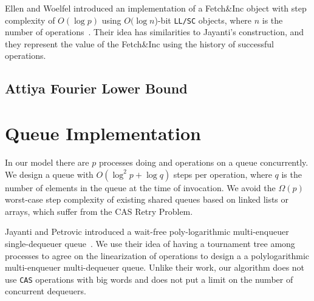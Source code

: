 \documentclass[10pt]{article}
\newcommand{\nf}[1]{{\normalfont{\texttt{#1}}}}
\theoremstyle{definition}
\begin{document}
Ellen and Woelfel introduced an implementation of a Fetch\&Inc object with step complexity of $O(\log p)$ using $O(\log n$)-bit \texttt{LL/SC} objects, where $n$ is the number of operations~\cite{10.1007/978-3-642-41527-2_20}. Their idea has similarities to Jayanti's construction, and they represent the value of the Fetch\&Inc using the history of successful operations. 




\subsection{Attiya Fourier Lower Bound}
\pagebreak

\pagebreak
\section{Queue Implementation} \label{DescriptQ}

In our model there are $p$ processes doing \nf{Enqueue} and \nf{Dequeue} operations on a queue concurrently. We design a queue with $O(\log^2 p +\log q)$ steps per operation, where $q$ is the number of elements in the queue at the time of invocation. We avoid the $\Omega(p)$ worst-case step complexity of existing shared queues based on linked lists or arrays, which suffer from the CAS Retry Problem. 

Jayanti and Petrovic introduced a wait-free poly-logarithmic multi-enqueuer single-dequeuer queue~\cite{DBLP:conf/fsttcs/JayantiP05}. We use their idea of having a tournament tree among processes to agree on the linearization of operations to design a a polylogarithmic multi-enqueuer multi-dequeuer queue. Unlike their work, our algorithm does not use \texttt{CAS} operations with big words and does not put a limit on the number of concurrent dequeuers. 
\end{document}
